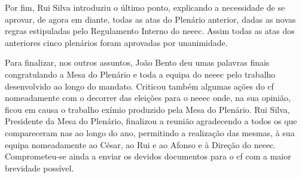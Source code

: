 Por fim, Rui Silva introduziu o último ponto, explicando a necessidade de se aprovar, de agora em diante, todas as atas do Plenário anterior, dadas as novas regras estipuladas pelo Regulamento Interno do \acrshort{neeec}. Assim todas as atas dos anteriores cinco plenários foram aprovadas por unanimidade.

Para finalizar, nos outros assuntos, João Bento deu umas palavras finais congratulando a Mesa do Plenário e toda a equipa do \acrshort{neeec} pelo trabalho desenvolvido ao longo do mandato. Criticou também algumas ações do \acrshort{cf} nomeadamente com o decorrer das eleições para o \acrshort{neeec} onde, na sua opinião, ficou em causa o trabalho exímio produzido pela Mesa do Plenário.
Rui Silva, Presidente da Mesa do Plenário, finalizou a reunião agradecendo a todos os que compareceram nas  ao longo do ano, permitindo a realização das mesmas, à sua equipa nomeadamente ao César, ao Rui e ao Afonso e à Direção do \acrshort{neeec}. Comprometeu-se ainda a enviar os devidos documentos para o \acrshort{cf} com a maior brevidade possível.